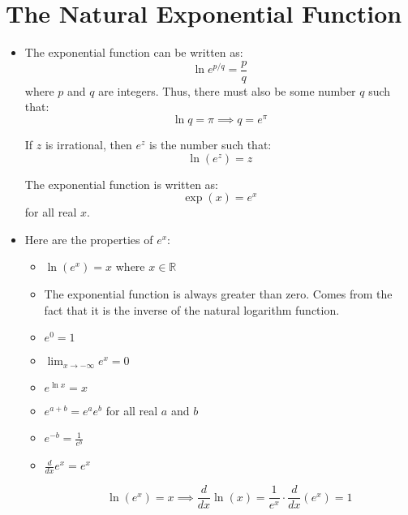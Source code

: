 \section{The Natural Exponential Function}
\begin{itemize}
    \item The exponential function can be written as:
    \begin{equation}
        \ln e^{p/q} = \frac{p}{q}
        \label{eq:}
    \end{equation}
    where $p$ and $q$ are integers. Thus, there must also be some number $q$ such that:
    \begin{equation}
        \ln q = \pi \implies q = e^{\pi}
        \label{eq:}
    \end{equation}
    \begin{definition}
        If $z$ is irrational, then $e^z$ is the number such that:
        \begin{equation}
            \ln(e^z) = z
            \label{eq:}
        \end{equation}
    \end{definition}  
    \begin{definition}
        The exponential function is written as:
        \begin{equation}
            \exp\left(x\right)=e^x
            \label{eq:}
        \end{equation}
        for all real $x$.
    \end{definition}
    \item Here are the properties of $e^x$:
    \begin{itemize}
        \item $\ln(e^x)=x$ where $x\in\mathbb{R}$
        \item The exponential function is always greater than zero. Comes from the fact that it is the inverse of the natural logarithm function.
        \item $e^0=1$
        \item $\lim_{x\to-\infty} e^x = 0$
        \item $e^{\ln x} = x$
        \item $e^{a+b}=e^ae^b$ for all real $a$ and $b$
        \item $e^{-b}=\frac{1}{e^b}$
        \item $\frac{d}{dx}e^x=e^x$
        \begin{prooof}
            $$\ln(e^x)= x \implies \frac{d}{dx} \ln(x) = \frac{1}{e^x} \cdot \frac{d}{dx}(e^x) = 1$$
        \end{prooof}

\end{itemize}
\end{itemize}

